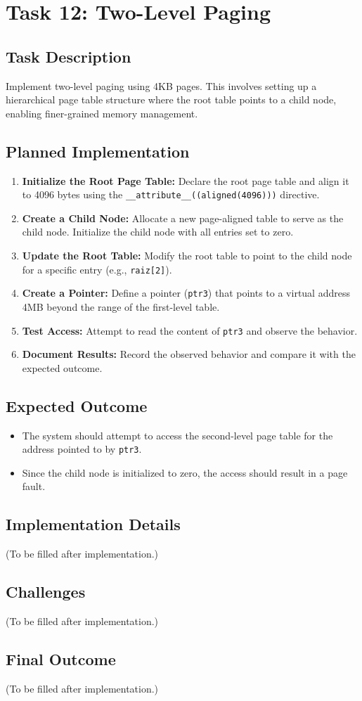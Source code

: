 \documentclass[a4paper,12pt]{report}
\begin{document}
\chapter{Task 12: Two-Level Paging}

\section{Task Description}
Implement two-level paging using 4KB pages. This involves setting up a hierarchical page table structure where the root table points to a child node, enabling finer-grained memory management.

\section{Planned Implementation}
\begin{enumerate}
    \item \textbf{Initialize the Root Page Table:}
    Declare the root page table and align it to 4096 bytes using the \texttt{\_\_attribute\_\_((aligned(4096)))} directive.
    \item \textbf{Create a Child Node:}
    Allocate a new page-aligned table to serve as the child node. Initialize the child node with all entries set to zero.
    \item \textbf{Update the Root Table:}
    Modify the root table to point to the child node for a specific entry (e.g., \texttt{raiz[2]}).
    \item \textbf{Create a Pointer:}
    Define a pointer (\texttt{ptr3}) that points to a virtual address 4MB beyond the range of the first-level table.
    \item \textbf{Test Access:}
    Attempt to read the content of \texttt{ptr3} and observe the behavior.
    \item \textbf{Document Results:}
    Record the observed behavior and compare it with the expected outcome.
\end{enumerate}

\section{Expected Outcome}
\begin{itemize}
    \item The system should attempt to access the second-level page table for the address pointed to by \texttt{ptr3}.
    \item Since the child node is initialized to zero, the access should result in a page fault.
\end{itemize}

\section{Implementation Details}
(To be filled after implementation.)

\section{Challenges}
(To be filled after implementation.)

\section{Final Outcome}
(To be filled after implementation.)
\end{document}
